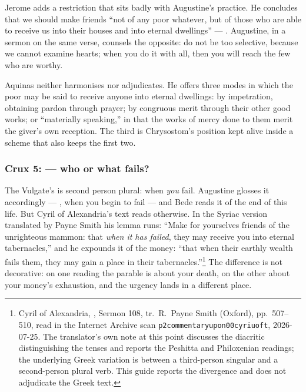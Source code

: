 Jerome adds a restriction that sits badly with Augustine's practice. He
concludes that we should make friends ``not of any poor whatever, but of those
who are able to receive us into their houses and into eternal dwellings'' ---
. Augustine, in
a sermon on the same verse, counsels the opposite: do not be too selective,
because we cannot examine hearts; when you do it with all, then you will reach
the few who are worthy.

Aquinas neither harmonises nor adjudicates. He offers three modes in which the
poor may be said to receive anyone into eternal dwellings: by impetration,
obtaining pardon through prayer; by congruous merit through their other good
works; or ``materially speaking,'' in that the works of mercy done to them
merit the giver's own reception. The third is Chrysostom's position kept alive
inside a scheme that also keeps the first two.

\subsubsection*{Crux 5:  --- who or what fails?}

The Vulgate's  is second person plural: when \emph{you}
fail. Augustine glosses it accordingly --- ,
when you begin to fail --- and Bede reads it of the end of this life. But Cyril
of Alexandria's text reads otherwise. In the Syriac version translated by Payne
Smith his lemma runs: ``Make for yourselves friends of the unrighteous mammon:
that \emph{when it has failed}, they may receive you into eternal
tabernacles,'' and he expounds it of the money: ``that when their earthly
wealth fails them, they may gain a place in their tabernacles.''\footnote{Cyril
of Alexandria, , Sermon 108, tr.\
R.~Payne Smith (Oxford), pp.\ 507--510, read in the Internet Archive scan
\texttt{p2commentaryupon00cyriuoft}, 2026-07-25. The translator's own note at
this point discusses the diacritic distinguishing the tenses and reports the
Peshitta and Philoxenian readings; the underlying Greek variation is between a
third-person singular and a second-person plural verb. This guide reports the
divergence and does not adjudicate the Greek text.} The difference is not
decorative: on one reading the parable is about your death, on the other about
your money's exhaustion, and the urgency lands in a different place.

